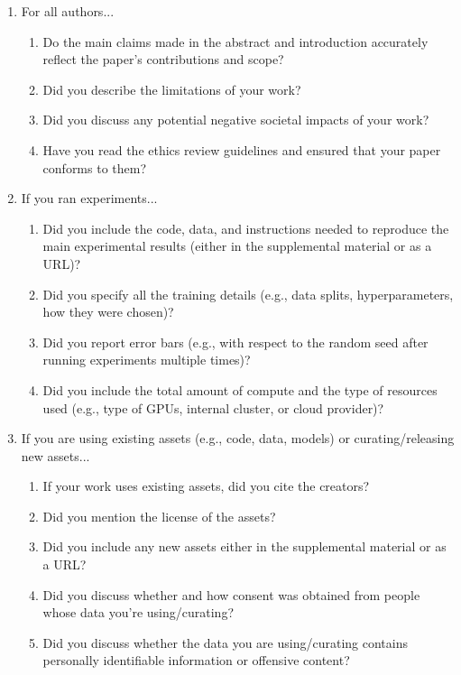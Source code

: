 \documentclass{article}
\begin{document}
\begin{enumerate}

\item For all authors...
\begin{enumerate}
  \item Do the main claims made in the abstract and introduction accurately reflect the paper's contributions and scope?
    \answerTODO{}
  \item Did you describe the limitations of your work?
    \answerTODO{}
  \item Did you discuss any potential negative societal impacts of your work?
    \answerTODO{}
  \item Have you read the ethics review guidelines and ensured that your paper conforms to them?
    \answerTODO{}
\end{enumerate}

\item If you ran experiments...
\begin{enumerate}
  \item Did you include the code, data, and instructions needed to reproduce the main experimental results (either in the supplemental material or as a URL)?
    \answerTODO{}
  \item Did you specify all the training details (e.g., data splits, hyperparameters, how they were chosen)?
    \answerTODO{}
	\item Did you report error bars (e.g., with respect to the random seed after running experiments multiple times)?
    \answerTODO{}
	\item Did you include the total amount of compute and the type of resources used (e.g., type of GPUs, internal cluster, or cloud provider)?
    \answerTODO{}
\end{enumerate}

\item If you are using existing assets (e.g., code, data, models) or curating/releasing new assets...
\begin{enumerate}
  \item If your work uses existing assets, did you cite the creators?
    \answerTODO{}
  \item Did you mention the license of the assets?
    \answerTODO{}
  \item Did you include any new assets either in the supplemental material or as a URL?
    \answerTODO{}
  \item Did you discuss whether and how consent was obtained from people whose data you're using/curating?
    \answerTODO{}
  \item Did you discuss whether the data you are using/curating contains personally identifiable information or offensive content?
    \answerTODO{}
\end{enumerate}

\end{enumerate}
\end{document}
